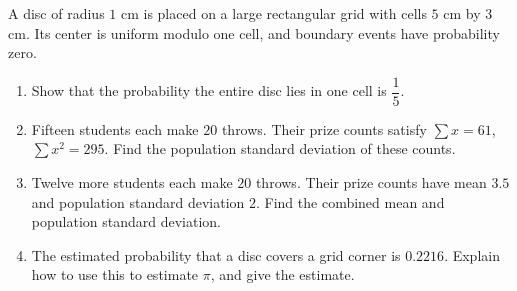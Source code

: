 A disc of radius $1$ cm is placed on a large rectangular grid with cells $5$ cm by $3$ cm. Its center is uniform modulo one cell, and boundary events have probability zero.
\begin{enumerate}
\item Show that the probability the entire disc lies in one cell is $\dfrac{1}{5}$.
\item Fifteen students each make $20$ throws. Their prize counts satisfy $\sum x=61$, $\sum x^2=295$. Find the population standard deviation of these counts.
\item Twelve more students each make $20$ throws. Their prize counts have mean $3.5$ and population standard deviation $2$. Find the combined mean and population standard deviation.
\item The estimated probability that a disc covers a grid corner is $0.2216$. Explain how to use this to estimate $\pi$, and give the estimate.
\end{enumerate}
